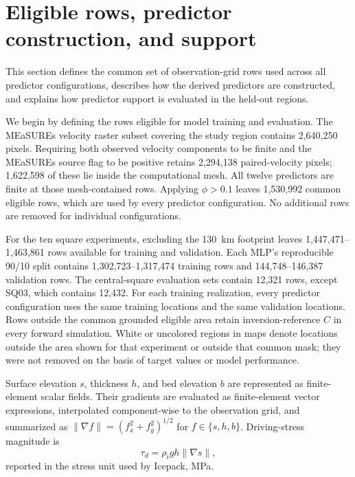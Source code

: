 \documentclass[review,jog]{igs}
\begin{document}
\section{Eligible rows, predictor construction, and support}
\label{app:predictor_population}

This section defines the common set of observation-grid rows used across all
predictor configurations, describes how the derived predictors are constructed,
and explains how predictor support is evaluated in the held-out regions.

We begin by defining the rows eligible for model training and evaluation. The
MEaSUREs velocity raster subset covering the study region contains 2,640,250
pixels. Requiring both observed velocity components to be finite and the
MEaSUREs source flag to be positive retains 2,294,138 paired-velocity pixels;
1,622,598 of these lie inside the computational mesh. All twelve predictors
are finite at those mesh-contained rows. Applying $\phi>0.1$ leaves 1,530,992
common eligible rows, which are used by every predictor configuration. No
additional rows are removed for individual configurations.

For the ten square experiments, excluding the 130~km footprint leaves 1,447,471--1,463,861 rows available for training and validation. Each MLP's reproducible 90/10 split contains 1,302,723--1,317,474 training rows and 144,748--146,387 validation rows. The central-square evaluation sets contain 12,321 rows, except SQ03, which contains 12,432. For each training realization, every predictor configuration uses the same training locations and the same validation locations. Rows outside the common grounded eligible area retain inversion-reference $C$ in every forward simulation. White or uncolored regions in maps denote locations outside the area shown for that experiment or outside that common mask; they were not removed on the basis of target values or model performance.

Surface elevation $s$, thickness $h$, and bed elevation $b$ are represented
as finite-element scalar fields. Their gradients are evaluated as
finite-element vector expressions, interpolated component-wise to the
observation grid, and summarized as
$\lVert\nabla f\rVert=(f_x^2+f_y^2)^{1/2}$ for
$f\in\{s,h,b\}$. Driving-stress magnitude is
\begin{equation}
\tau_d=\rho_i g h\lVert\nabla s\rVert,
\end{equation}
reported in the stress unit used by Icepack, MPa.
\end{document}
